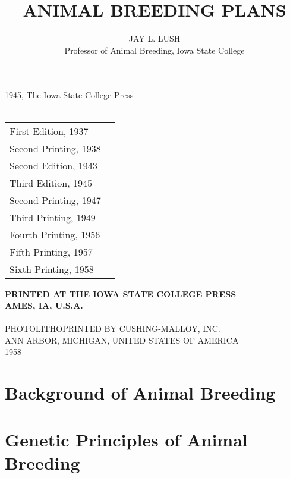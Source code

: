 \documentclass[10pt, onecolumn, twoside, openright]{memoir}
\title{ANIMAL BREEDING PLANS}
\author{JAY L. LUSH\\Professor of Animal Breeding, Iowa State College}
\begin{document}
\maketitle

\frontmatter

\begin{center}
\textcopyright{} 1945, The Iowa State College Press\\
 ~\\
\begin{tabular}{ll}
	First Edition, 1937\\
	Second Printing, 1938\\
	Second Edition, 1943\\
	Third Edition, 1945\\
	Second Printing, 1947\\
	Third Printing, 1949\\
	Fourth Printing, 1956\\
	Fifth Printing, 1957\\
	Sixth Printing, 1958\\
\end{tabular}
\vfill
\vfill
\textbf{PRINTED AT THE IOWA STATE COLLEGE PRESS\\
AMES, IA, U.S.A.}\\
~\\
PHOTOLITHOPRINTED BY CUSHING-MALLOY, INC.\\
ANN ARBOR, MICHIGAN, UNITED STATES OF AMERICA\\
1958
\end{center}




\newpage

\tableofcontents

\mainmatter

\part*{Background of Animal Breeding}






\part*{Genetic Principles of Animal Breeding}





\end{document}
